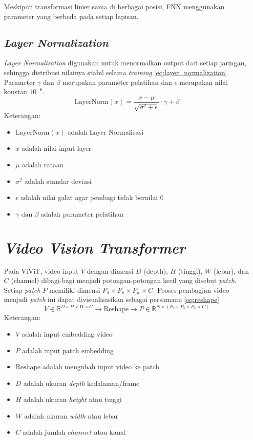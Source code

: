 Meskipun transformasi linier sama di berbagai posisi, FNN menggunakan parameter yang berbeda pada setiap lapisan.
\subsection{\textit{Layer Nornalization}}
\textit{Layer Normalization} digunakan untuk menormalkan output dari setiap jaringan, sehingga distribusi nilainya stabil selama \textit{training} \ref{eq:layer_normalization}. Parameter $\gamma$ dan $\beta$ merupakan parameter pelatihan dan $\epsilon$ merupakan nilai konstan $10^{-6}$.
\begin{equation}
    \text{LayerNorm}(x) = \frac{x - \mu}{\sqrt{\sigma^2 + \epsilon}} \cdot \gamma + \beta
    \label{eq:layer_normalization}
\end{equation}
Keterangan:
\begin{itemize}
    \item $\text{LayerNorm}(x)$ adalah Layer Normalisasi
    \item $x$ adalah nilai input layer
    \item $\mu$ adalah rataan
    \item $\sigma^2$ adalah standar deviasi
    \item $\epsilon$ adalah nilai galat agar pembagi tidak bernilai $0$
    \item $\gamma \text{ dan } \beta$ adalah parameter pelatihan
\end{itemize}
\section{\textit{Video Vision Transformer}}
Pada ViViT, video input $V$ dengan dimensi $D$ (depth), $H$ (tinggi), $W$ (lebar), dan $C$ (channel) dibagi-bagi menjadi potongan-potongan kecil yang disebut \textit{patch}\cite{arnab2021vivitvideovisiontransformer}. Setiap \textit{patch} $P$ memiliki dimensi $P_d \times P_h \times P_w \times C$.
Proses pembagian video menjadi \textit{patch} ini dapat divisualisasikan sebagai persamaan \ref{eq:reshape}
\begin{equation}
   V \in \mathbb{R}^{D \times H \times W \times C} \rightarrow \text{Reshape} \rightarrow P \in \mathbb{R}^{N \times (P_d \times P_h \times P_w \times C)}
   \label{eq:reshape}
\end{equation}
Keterangan:
\begin{itemize}
    \item $V$ adalah input embedding video
    \item $P$ adalah input patch embedding
    \item $\text{Reshape}$ adalah mengubah input video ke patch
    \item $D$ adalah ukuran \textit{depth} kedalaman/frame
    \item $H$ adalah ukuran \textit{height} atau tinggi
    \item $W$ adalah ukuran \textit{width} atau lebar
    \item $C$ adalah jumlah $channel$ atau kanal
\end{itemize}

